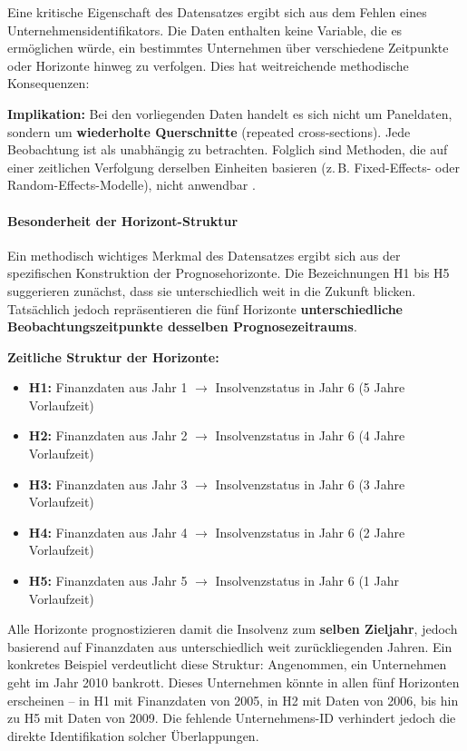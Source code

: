 Eine kritische Eigenschaft des Datensatzes ergibt sich aus dem Fehlen eines Unternehmensidentifikators. Die Daten enthalten keine Variable, die es ermöglichen würde, ein bestimmtes Unternehmen über verschiedene Zeitpunkte oder Horizonte hinweg zu verfolgen. Dies hat weitreichende methodische Konsequenzen:

\textbf{Implikation:} Bei den vorliegenden Daten handelt es sich nicht um Paneldaten, sondern um \textbf{wiederholte Querschnitte} (repeated cross-sections). Jede Beobachtung ist als unabhängig zu betrachten. Folglich sind Methoden, die auf einer zeitlichen Verfolgung derselben Einheiten basieren (z.\,B. Fixed-Effects- oder Random-Effects-Modelle), nicht anwendbar \parencite{wooldridge2010econometric}.

\paragraph{Besonderheit der Horizont-Struktur}

Ein methodisch wichtiges Merkmal des Datensatzes ergibt sich aus der spezifischen Konstruktion der Prognosehorizonte. Die Bezeichnungen H1 bis H5 suggerieren zunächst, dass sie unterschiedlich weit in die Zukunft blicken. Tatsächlich jedoch repräsentieren die fünf Horizonte \textbf{unterschiedliche Beobachtungszeitpunkte desselben Prognosezeitraums}.

\textbf{Zeitliche Struktur der Horizonte:}

\begin{itemize}[topsep=0.3\baselineskip]
    \item \textbf{H1:} Finanzdaten aus Jahr 1 $\rightarrow$ Insolvenzstatus in Jahr 6 (5 Jahre Vorlaufzeit)
    \item \textbf{H2:} Finanzdaten aus Jahr 2 $\rightarrow$ Insolvenzstatus in Jahr 6 (4 Jahre Vorlaufzeit)
    \item \textbf{H3:} Finanzdaten aus Jahr 3 $\rightarrow$ Insolvenzstatus in Jahr 6 (3 Jahre Vorlaufzeit)
    \item \textbf{H4:} Finanzdaten aus Jahr 4 $\rightarrow$ Insolvenzstatus in Jahr 6 (2 Jahre Vorlaufzeit)
    \item \textbf{H5:} Finanzdaten aus Jahr 5 $\rightarrow$ Insolvenzstatus in Jahr 6 (1 Jahr Vorlaufzeit)
\end{itemize}

Alle Horizonte prognostizieren damit die Insolvenz zum \textbf{selben Zieljahr}, jedoch basierend auf Finanzdaten aus unterschiedlich weit zurückliegenden Jahren. Ein konkretes Beispiel verdeutlicht diese Struktur: Angenommen, ein Unternehmen geht im Jahr 2010 bankrott. Dieses Unternehmen könnte in allen fünf Horizonten erscheinen -- in H1 mit Finanzdaten von 2005, in H2 mit Daten von 2006, bis hin zu H5 mit Daten von 2009. Die fehlende Unternehmens-ID verhindert jedoch die direkte Identifikation solcher Überlappungen.

